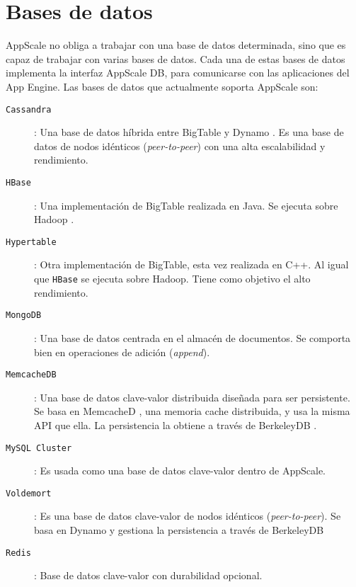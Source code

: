 \section{Bases de datos}


AppScale no obliga a trabajar con una base de datos determinada, sino que es capaz de trabajar con varias bases de datos. Cada una de estas bases de datos implementa la interfaz AppScale DB, para comunicarse con las aplicaciones del App Engine. Las bases de datos que actualmente soporta AppScale son:

\begin{description}
\item[\texttt{Cassandra}] \cite{appscale-cassandra}: Una base de datos híbrida entre BigTable \cite{appscale-bigtable} y Dynamo \cite{appscale-dynamo}. Es una base de datos de nodos idénticos (\emph{peer-to-peer}) con una alta escalabilidad y rendimiento.
\item[\texttt{HBase}] \cite{appscale-hbase}: Una implementación de BigTable realizada en Java. Se ejecuta sobre Hadoop \cite{appscale-hadoop}.
\item[\texttt{Hypertable}] \cite{appscale-hypertable}: Otra implementación de BigTable, esta vez realizada en C++. Al igual que \texttt{HBase} se ejecuta sobre Hadoop. Tiene como objetivo el alto rendimiento.
\item[\texttt{MongoDB}] \cite{appscale-mongodb}: Una base de datos centrada en el almacén de documentos. Se comporta bien en operaciones de adición (\emph{append}).
\item[\texttt{MemcacheDB}] \cite{appscale-memcachedb}: Una base de datos clave-valor distribuida diseñada para ser persistente. Se basa en MemcacheD \cite{appscale-memcached}, una memoria cache distribuida, y usa la misma API que ella. La persistencia la obtiene a través de BerkeleyDB \cite{appscale-berkeleydb}.
\item[\texttt{MySQL Cluster}] \cite{appscale-mysql}: Es usada como una base de datos clave-valor dentro de AppScale.
\item[\texttt{Voldemort}] \cite{appscale-voldemort}: Es una base de datos clave-valor de nodos idénticos (\emph{peer-to-peer}). Se basa en Dynamo y gestiona la persistencia a través de BerkeleyDB
\item[\texttt{Redis}] \cite{appscale-redis}: Base de datos clave-valor con durabilidad opcional.
\end{description}

